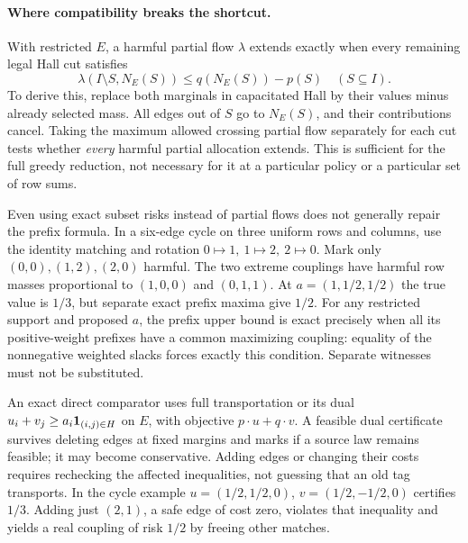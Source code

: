 \documentclass{article}
\begin{document}
\paragraph{Where compatibility breaks the shortcut.}
With restricted \(E\), a harmful partial flow \(\lambda\)
extends exactly when every remaining legal Hall cut satisfies
\[
 \lambda(I\setminus S,N_E(S))\le q(N_E(S))-p(S)
 \quad(S\subseteq I).
\]
To derive this, replace both marginals in capacitated Hall
by their values minus already selected mass. All edges out
of \(S\) go to \(N_E(S)\), and their contributions cancel.
Taking the maximum allowed crossing partial flow separately
for each cut tests whether \emph{every} harmful partial
allocation extends. This is sufficient for the full
greedy reduction, not necessary for it at a particular
policy or a particular set of row sums.

Even using exact subset risks instead of partial flows does not
generally repair the prefix formula. In a six-edge cycle on
three uniform rows and columns, use the identity matching and
rotation \(0\mapsto1,\ 1\mapsto2,\ 2\mapsto0\).
Mark only \((0,0),(1,2),(2,0)\) harmful. The two extreme
couplings have harmful row masses proportional to
\((1,0,0)\) and \((0,1,1)\). At \(a=(1,1/2,1/2)\) the
true value is \(1/3\), but separate exact prefix maxima give
\(1/2\). For any restricted support and proposed \(a\), the
prefix upper bound is exact precisely when all its
positive-weight prefixes have a common maximizing coupling:
equality of the nonnegative weighted slacks forces exactly
this condition. Separate witnesses must not be substituted.

An exact direct comparator uses full transportation or its
dual \(u_i+v_j\ge a_i{\bf1}_{(i,j)\in H}\) on \(E\), with
objective \(p\cdot u+q\cdot v\). A feasible dual certificate
survives deleting edges at fixed margins and marks if a source
law remains feasible; it may become conservative. Adding edges
or changing their costs requires rechecking the affected
inequalities, not guessing that an old tag transports.
In the cycle example \(u=(1/2,1/2,0)\),
\(v=(1/2,-1/2,0)\) certifies \(1/3\). Adding just
\((2,1)\), a safe edge of cost zero, violates that inequality
and yields a real coupling of risk \(1/2\) by freeing other matches.
\end{document}
